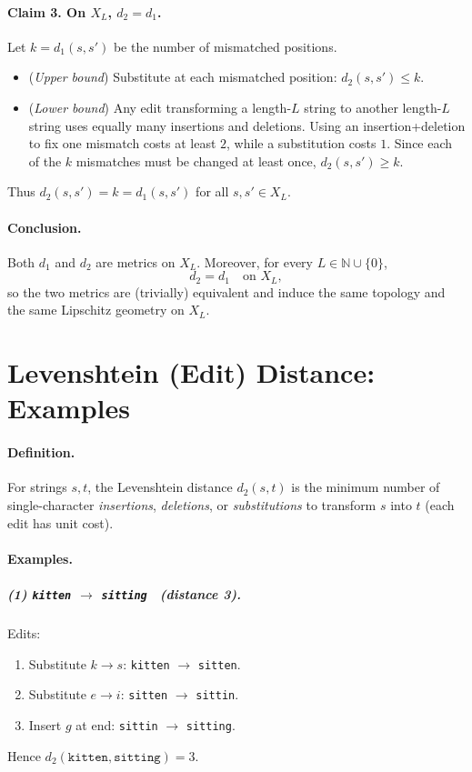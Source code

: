 \documentclass[12pt,a4paper]{article}
\begin{document}
\paragraph{Claim 3. On $X_L$, $d_2=d_1$.}
Let $k=d_1(s,s')$ be the number of mismatched positions.
\begin{itemize}
	\item (\emph{Upper bound}) Substitute at each mismatched position: $d_2(s,s')\le k$.
	\item (\emph{Lower bound}) Any edit transforming a length-$L$ string to another length-$L$ string uses equally many insertions and deletions. Using an insertion+deletion to fix one mismatch costs at least $2$, while a substitution costs $1$. Since each of the $k$ mismatches must be changed at least once, $d_2(s,s')\ge k$.
\end{itemize}
Thus $d_2(s,s')=k=d_1(s,s')$ for all $s,s'\in X_L$.

\paragraph{Conclusion.}
Both $d_1$ and $d_2$ are metrics on $X_L$. Moreover, for every $L\in\mathbb{N}\cup\{0\}$,
\[
d_2=d_1 \quad\text{on } X_L,
\]
so the two metrics are (trivially) equivalent and induce the same topology and the same Lipschitz geometry on $X_L$.

\section*{Levenshtein (Edit) Distance: Examples}

\paragraph{Definition.}
For strings $s,t$, the Levenshtein distance $d_2(s,t)$ is the minimum number of single-character \emph{insertions}, \emph{deletions}, or \emph{substitutions} to transform $s$ into $t$ (each edit has unit cost).

\paragraph{Examples.}

\subparagraph{(1) \texttt{kitten} $\to$ \texttt{sitting} \ (distance 3).}
Edits:
\begin{enumerate}
	\item Substitute $k\to s$: \texttt{kitten} $\to$ \texttt{sitten}.
	\item Substitute $e\to i$: \texttt{sitten} $\to$ \texttt{sittin}.
	\item Insert $g$ at end: \texttt{sittin} $\to$ \texttt{sitting}.
\end{enumerate}
Hence $d_2(\texttt{kitten},\texttt{sitting})=3$.
\end{document}
